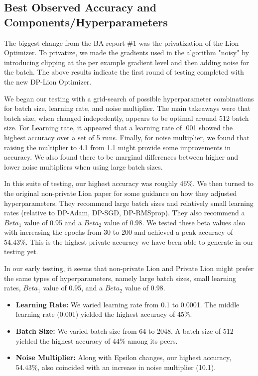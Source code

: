 \subsection{Best Observed Accuracy and Components/Hyperparameters}\label{subsec:best-accuracy2}
The biggest change from the BA report \#1 was the privatization of the Lion Optimizer. To privatize, we made the gradients used in the algorithm "noisy" by introducing clipping
at the per example gradient level and then adding noise for the batch. The above results indicate the first round of testing completed with the new DP-Lion Optimizer.

We began our testing with a grid-search of possible hyperparameter combinations for batch size, learning rate, and noise multiplier. The main takeaways were that batch size,
when changed indepedently, appears to be optimal around 512 batch size. For Learning rate, it appeared that a learning rate of .001 showed the highest accuracy over a set of 5
runs. Finally, for noise multiplier, we found that raising the multiplier to 4.1 from 1.1 might provide some improvements in accuracy. We also found there to be marginal differences
between higher and lower noise multipliers when using large batch sizes.

In this suite of testing, our highest accuracy was roughly 46\%. We then turned to the original non-private Lion paper for some guidance on how they adjusted hyperparameters. They recommend 
large batch sizes and relatively small learning rates (relative to DP-Adam, DP-SGD, DP-RMSprop). They also recommend a $Beta_{1}$ value of 0.95 and a $Beta_{2}$ value of 0.98. We tested
these beta values also with increasing the epochs from 30 to 200 and achieved a peak accuracy of 54.43\%. This is the highest private accuracy we have been able to generate in our testing
yet. 

In our early testing, it seems that non-private Lion and Private Lion might prefer the same types of hyperparameters, namely large batch sizes, small learning rates, $Beta_{1}$ value of 0.95,
and a $Beta_{2}$ value of 0.98.

\begin{itemize}
    \item \textbf{Learning Rate:} We varied learning rate from 0.1 to 0.0001. The middle learning rate (0.001) yielded the highest accuracy of 45\%.
    \item \textbf{Batch Size:} We varied batch size from 64 to 2048. A batch size of 512 yielded the highest accuracy of 44\% among its peers.
    \item \textbf{Noise Multiplier:} Along with Epsilon changes, our highest accuracy, 54.43\%, also coincided with an increase in noise multiplier (10.1).
\end{itemize}

